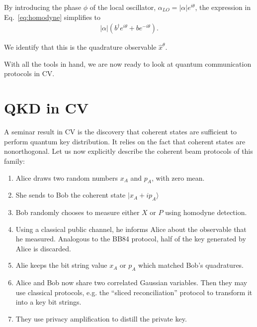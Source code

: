 \documentclass[pra,
superscriptaddress,
 amsmath,amssymb,
 aps,twocolumn]{revtex4-1}
\newcommand{\ket}[1]{|{#1}\rangle}
\begin{document}
\noindent By introducing the phase $\phi$ of the local oscillator, \mbox{$\alpha_{LO} = |\alpha|e^{i\theta}$}, 
the expression in Eq.~\eqref{eq:homodyne} simplifies to 
\begin{eqnarray}
 |\alpha|(b^\dagger e^{i\theta}+ b e^{-i\theta}).
\end{eqnarray}

\noindent We identify that this is the quadrature observable $\hat x^{\theta}$.
% 

With all the tools in hand, we are now ready to look at quantum communication protocols in CV. \cite{bib:PhysRevLett.88.057902}

\section{QKD in CV}
A seminar result in CV is the discovery that coherent states are sufficient to perform quantum key distribution. It relies on the fact that coherent states are nonorthogonal.
Let us now explicitly describe 
the coherent beam protocols of this family: 
\begin{enumerate}
\item Alice
draws two random numbers $x_A$ and $p_A$, with zero mean.
\item  She sends to Bob
the coherent state $\ket{x_A + i p_A }$
\item  Bob randomly chooses
to measure either $X$ or $P$ using homodyne detection. 
\item Using a classical public channel, he informs
Alice about the observable that he measured.  Analogous to the BB84 protocol, half of the key generated by Alice is discarded.
\item Alie keeps the bit string value $x_A$ or $p_A$ which matched Bob's quadratures.
\item
Alice and Bob now share two correlated Gaussian
variables. Then they may use classical protocols, e.g. the “sliced reconciliation”
protocol to transform it into a key bit strings.
\item They use privacy
amplification to distill the private key.
\end{enumerate}


\end{document}
